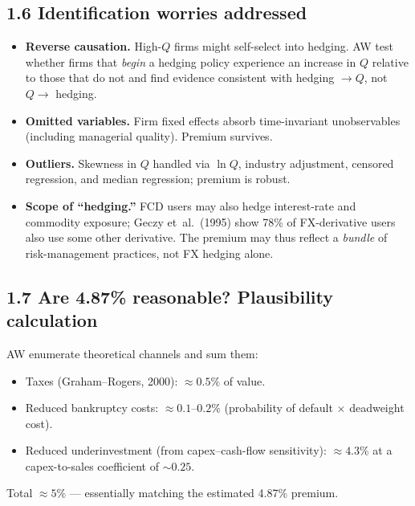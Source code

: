\documentclass[11pt]{article}
\begin{document}
\subsection*{1.6 Identification worries addressed}
\begin{itemize}
\item \textbf{Reverse causation.} High-$Q$ firms might self-select into hedging. AW test whether firms that \emph{begin} a hedging policy experience an increase in $Q$ relative to those that do not and find evidence consistent with hedging $\to Q$, not $Q \to$ hedging.
\item \textbf{Omitted variables.} Firm fixed effects absorb time-invariant unobservables (including managerial quality). Premium survives.
\item \textbf{Outliers.} Skewness in $Q$ handled via $\ln Q$, industry adjustment, censored regression, and median regression; premium is robust.
\item \textbf{Scope of ``hedging.''} FCD users may also hedge interest-rate and commodity exposure; Geczy et~al.~(1995) show 78\% of FX-derivative users also use some other derivative. The premium may thus reflect a \emph{bundle} of risk-management practices, not FX hedging alone.
\end{itemize}

\subsection*{1.7 Are 4.87\% reasonable? Plausibility calculation}
AW enumerate theoretical channels and sum them:
\begin{itemize}
\item Taxes (Graham--Rogers, 2000): $\approx 0.5\%$ of value.
\item Reduced bankruptcy costs: $\approx 0.1$--$0.2\%$ (probability of default $\times$ deadweight cost).
\item Reduced underinvestment (from capex--cash-flow sensitivity): $\approx 4.3\%$ at a capex-to-sales coefficient of $\sim 0.25$.
\end{itemize}
Total $\approx 5\%$ --- essentially matching the estimated 4.87\% premium.
\end{document}
